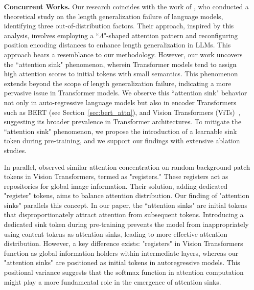 \documentclass{article} \usepackage{iclr2024_conference,times}
\begin{document}
\textbf{Concurrent Works.} Our research coincides with the work of \citeauthor{han2023lminfinite}, who conducted a theoretical study on the length generalization failure of language models, identifying three out-of-distribution factors. Their approach, inspired by this analysis, involves employing a ``$\Lambda$"-shaped attention pattern and reconfiguring position encoding distances to enhance length generalization in LLMs. This approach bears a resemblance to our methodology. However, our work uncovers the ``attention sink" phenomenon, wherein Transformer models tend to assign high attention scores to initial tokens with small semantics. This phenomenon extends beyond the scope of length generalization failure, indicating a more pervasive issue in Transformer models. We observe this ``attention sink" behavior not only in auto-regressive language models but also in encoder Transformers such as BERT (see Section~\ref{sec:bert_attn}), and Vision Transformers (ViTs)~\citep{Darcet2023Registers}, suggesting its broader prevalence in Transformer architectures. To mitigate the ``attention sink" phenomenon, we propose the introduction of a learnable sink token during pre-training, and we support our findings with extensive ablation studies. 

In parallel, \citeauthor{Darcet2023Registers} observed similar attention concentration on random background patch tokens in Vision Transformers, termed as "registers." These registers act as repositories for global image information. Their solution, adding dedicated "register" tokens, aims to balance attention distribution. Our finding of "attention sinks" parallels this concept. In our paper, the ``attention sinks" are initial tokens that disproportionately attract attention from subsequent tokens. Introducing a dedicated sink token during pre-training prevents the model from inappropriately using content tokens as attention sinks, leading to more effective attention distribution. However, a key difference exists: "registers" in Vision Transformers function as global information holders within intermediate layers, whereas our "attention sinks" are positioned as initial tokens in autoregressive models. This positional variance suggests that the softmax function in attention computation might play a more fundamental role in the emergence of attention sinks.
\end{document}
